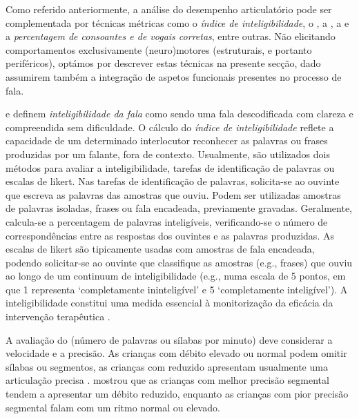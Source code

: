 \documentclass[output=paper]{LSP/langsci}
\begin{document}
Como referido anteriormente, a análise do desempenho articulatório pode ser complementada por técnicas métricas como o \textit{índice de inteligibilidade}, o \textit{}, a \textit{}, a \textit{} e a \textit{percentagem de consoantes e de vogais corretas}, entre outras. Não elicitando comportamentos exclusivamente (neuro)motores (estruturais, e portanto periféricos), optámos por descrever estas técnicas na presente secção, dado assumirem também a integração de aspetos funcionais presentes no processo de fala. 

\citet{miller2013} e \citet{pascoe_etal2006} definem \textit{inteligibilidade da fala} como sendo uma fala descodificada com clareza e compreendida sem dificuldade. O cálculo do \textit{índice de inteligibilidade} reflete a capacidade de um determinado interlocutor reconhecer as palavras ou frases produzidas por um falante, fora de contexto. Usualmente, são utilizados dois métodos para avaliar a inteligibilidade, tarefas de identificação de palavras ou escalas de likert. Nas tarefas de identificação de palavras, solicita-se ao ouvinte que escreva as palavras das amostras que ouviu. Podem ser utilizadas amostras de palavras isoladas, frases ou fala encadeada, previamente gravadas. Geralmente, calcula-se a percentagem de palavras inteligíveis, verificando-se o número de correspondências entre as respostas dos ouvintes e as palavras produzidas. As escalas de likert são tipicamente usadas com amostras de fala encadeada, podendo solicitar-se ao ouvinte que classifique as amostras (e.g., frases) que ouviu ao longo de um continuum de inteligibilidade (e.g., numa escala de 5 pontos, em que 1 representa ‘completamente ininteligível’ e 5 ‘completamente inteligível’). A inteligibilidade constitui uma medida essencial à monitorização da eficácia da intervenção terapêutica \citep{lousada_etal2014}.

A avaliação do \textit{} (número de palavras ou sílabas por minuto) deve considerar a velocidade e a precisão. As crianças com débito elevado ou normal podem omitir sílabas ou segmentos, as crianças com  reduzido apresentam usualmente uma articulação precisa \citep{bowen2015}. \citet{skinder2000} mostrou que as crianças com melhor precisão segmental tendem a apresentar um débito reduzido, enquanto as crianças com pior precisão segmental falam com um ritmo normal ou elevado. 
\end{document}
